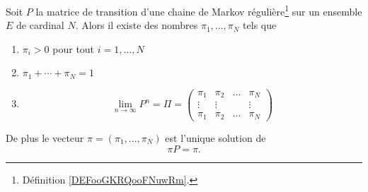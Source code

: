\begin{theorem}
	Soit \( P\) la matrice de transition d'une chaine de Markov régulière\footnote{Définition \ref{DEFooGKRQooFNuwRm}.} sur un ensemble \( E\) de cardinal \( N\). Alors il existe des nombres \( \pi_1,\ldots, \pi_N\) tels que
	\begin{enumerate}
		\item
		      \( \pi_i>0\) pour tout \( i=1,\ldots, N\)
		\item
		      \( \pi_1+\cdots +\pi_N=1\)
		\item
		      \begin{equation}
			      \lim_{n\to \infty} P^n=\Pi=\begin{pmatrix}
				      \pi_1  & \pi_2  & \ldots & \pi_N  \\
				      \vdots & \vdots &        & \vdots \\
				      \pi_1  & \pi_2  & \ldots & \pi_N
			      \end{pmatrix}
		      \end{equation}
	\end{enumerate}
	De plus le vecteur \( \pi=(\pi_1,\ldots, \pi_N)\) est l'unique solution de
	\begin{equation}
		\pi P=\pi.
	\end{equation}
\end{theorem}

